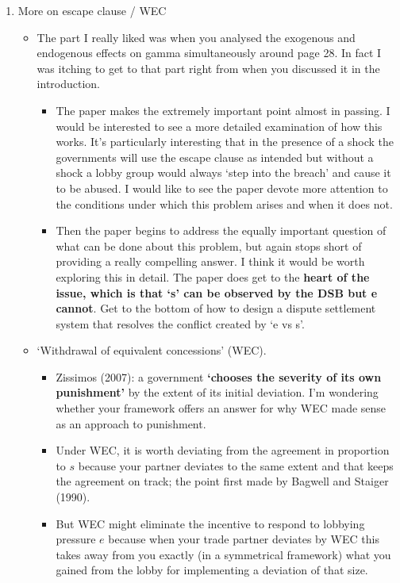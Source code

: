 \documentclass[12pt]{article}
\begin{document}
\begin{enumerate}
\newpage
	\item More on escape clause / WEC
		\begin{itemize}
			\item The part I really liked was when you analysed the exogenous and endogenous effects on gamma simultaneously around page 28.  In fact I was itching to get to that part right from when you discussed it in the introduction.  
				\begin{itemize}
					\item The paper makes the extremely important point almost in passing.  I would be interested to see a more detailed examination of how this works.  It's particularly interesting that in the presence of a shock the governments will use the escape clause as intended but without a shock a lobby group would always `step into the breach' and cause it to be abused.  I would like to see the paper devote more attention to the conditions under which this problem arises and when it does not.
					\item Then the paper begins to address the equally important question of what can be done about this problem, but again stops short of providing a really compelling answer.  I think it would be worth exploring this in detail.  The paper does get to the \textbf{heart of the issue, which is that `s' can be observed by the DSB but e cannot}.  Get to the bottom of how to design a dispute settlement system that resolves the conflict created by `e vs s'.
				\end{itemize}
			\item `Withdrawal of equivalent concessions' (WEC).
				\begin{itemize}
					\item Zissimos (2007): a government \textbf{`chooses the severity of its own punishment'} by the extent of its initial deviation. I'm wondering whether your framework offers an answer for why WEC made sense as an approach to punishment.
					\item Under WEC, it is worth deviating from the agreement in proportion to $s$ because your partner deviates to the same extent and that keeps the agreement on track; the point first made by Bagwell and Staiger (1990).
					\item But WEC might eliminate the incentive to respond to lobbying pressure $e$ because when your trade partner deviates by WEC this takes away from you exactly (in a symmetrical framework) what you gained from the lobby for implementing a deviation of that size.
						\begin{itemize}

\end{itemize}
\end{itemize}
\end{itemize}
\end{enumerate}
\end{document}
